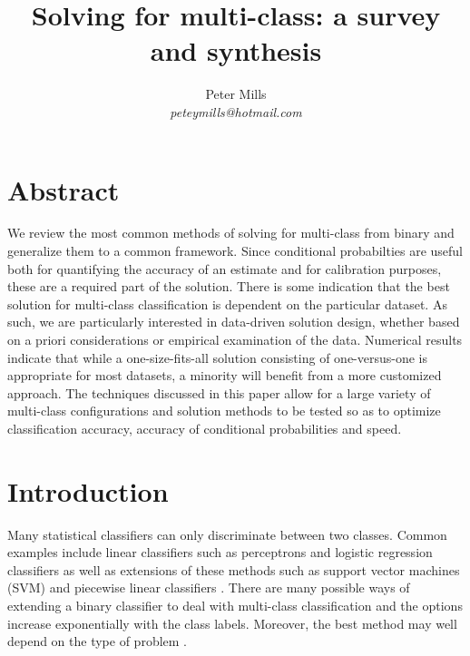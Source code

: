 \documentclass{article}
\begin{document}
\title{Solving for multi-class: a survey and synthesis}

\author{Peter Mills\\\textit{peteymills@hotmail.com}}

\maketitle

\section*{Abstract}

We review the most common methods of solving for multi-class from binary
and generalize them to a common framework.
Since conditional probabilties are useful both for quantifying the accuracy of
an estimate and for calibration purposes, 
these are a required part of the solution.
There is some indication that the best solution for multi-class classification
is dependent on the particular dataset.
As such, we are particularly interested in data-driven solution design, 
whether based on a priori considerations or empirical examination of the data.
Numerical results indicate that while
a one-size-fits-all solution consisting of one-versus-one 
is appropriate for most datasets,
a minority will benefit from a more customized approach.
The techniques discussed in this paper allow for a large variety of multi-class
configurations and solution methods to be tested so as to optimize 
classification accuracy, accuracy of conditional probabilities and speed.

\tableofcontents

\section{Introduction}

Many statistical classifiers can only discriminate between two classes.
Common examples include linear classifiers such as perceptrons and
logistic regression classifiers \citep{Michie_etal1994} as well as extensions
of these methods such as support vector machines (SVM) \citep{Mueller_etal2001} and 
piecewise linear classifiers \citep{Mills2018, Bagirov2005}.
There are many possible ways of extending a binary classifier to deal
with multi-class classification and the options increase exponentially
with the class labels.
Moreover, the best method may well depend on the type of problem
\citep{Dietterich_Bakiri1995,Allwein_etal2000}.
\end{document}
